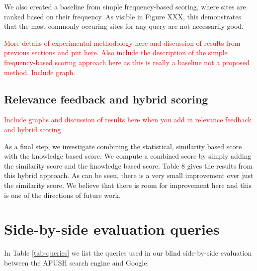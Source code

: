 \documentclass[pdfpagelabels=false,plainpages=true]{acm_proc_article-sp}
\begin{document}
We also created a baseline from simple frequency-based scoring, where
sites are ranked based on their frequency. As visible in Figure XXX, this demonstrates that the
most commonly occuring sites for any query are not necessarily good. 

\textcolor{red}{More details of experimental methodology here and discussion
  of results from previous sections and put here. Also include the description
  of the simple frequency-based scoring approach here as this is really a baseline
  not a proposed method. Include graph.}  

\subsection{Relevance feedback and hybrid scoring}

\textcolor{red}{Include graphs and discussion of results here when you add in
  relevance feedback and hybrid scoring}

As a final step, we investigate combining the statistical, similarity based
score with the knowledge based score. We compute a combined score by simply
adding the similarity score and the knowledge based score. Table 8 gives the
results from this hybrid approach. As can be seen, there is a very small
improvement over just the similarity score. We believe that there is room for
improvement here and this is one of the directions of future work. 




\appendix
\section{Side-by-side evaluation queries}
\label{app-queries}

In Table \ref{tab-queries} we list the queries used in our blind side-by-side
evaluation between the APUSH search engine and Google.
\end{document}
